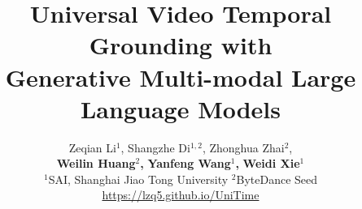 \documentclass{article}
\title{Universal Video Temporal Grounding with \\ Generative Multi-modal Large Language Models}
\author{Zeqian Li$^{1}$, \quad Shangzhe Di$^{1,2}$, \quad Zhonghua Zhai$^{2}$, \\[2pt] \textbf{Weilin Huang}$^{2}$\textbf{,} \quad \textbf{Yanfeng Wang}$^{1}$\textbf{,} \quad \textbf{Weidi Xie}$^{1}$\\[4pt]
$^{1}$SAI, Shanghai Jiao Tong University \quad
$^{2}$ByteDance Seed
\\[4pt]
\url{https://lzq5.github.io/UniTime}
}
\begin{document}
\maketitle






\clearpage

{\small

}

\end{document}
